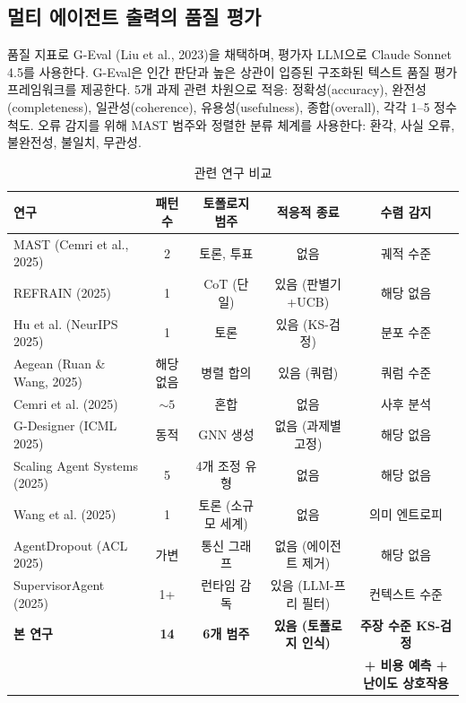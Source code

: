 \documentclass[a4paper,11pt]{article}
\begin{document}
\subsection{멀티 에이전트 출력의 품질 평가}

품질 지표로 G-Eval (Liu et al., 2023)을 채택하며, 평가자 LLM으로 Claude Sonnet 4.5를 사용한다. G-Eval은 인간 판단과 높은 상관이 입증된 구조화된 텍스트 품질 평가 프레임워크를 제공한다. 5개 과제 관련 차원으로 적응: 정확성(accuracy), 완전성(completeness), 일관성(coherence), 유용성(usefulness), 종합(overall), 각각 1--5 정수 척도. 오류 감지를 위해 MAST 범주와 정렬한 분류 체계를 사용한다: 환각, 사실 오류, 불완전성, 불일치, 무관성.

\begin{table}[H]
\centering
\caption{관련 연구 비교}
\label{tab:related-work}
{\small
\begin{tabular}{lcccc}
\toprule
\textbf{연구} & \textbf{패턴 수} & \textbf{토폴로지 범주} & \textbf{적응적 종료} & \textbf{수렴 감지} \\
\midrule
MAST (Cemri et al., 2025) & 2 & 토론, 투표 & 없음 & 궤적 수준 \\
REFRAIN (2025) & 1 & CoT (단일) & 있음 (판별기+UCB) & 해당 없음 \\
Hu et al. (NeurIPS 2025) & 1 & 토론 & 있음 (KS-검정) & 분포 수준 \\
Aegean (Ruan \& Wang, 2025) & 해당 없음 & 병렬 합의 & 있음 (쿼럼) & 쿼럼 수준 \\
Cemri et al. (2025) & ${\sim}5$ & 혼합 & 없음 & 사후 분석 \\
G-Designer (ICML 2025) & 동적 & GNN 생성 & 없음 (과제별 고정) & 해당 없음 \\
Scaling Agent Systems (2025) & 5 & 4개 조정 유형 & 없음 & 해당 없음 \\
Wang et al. (2025) & 1 & 토론 (소규모 세계) & 없음 & 의미 엔트로피 \\
AgentDropout (ACL 2025) & 가변 & 통신 그래프 & 없음 (에이전트 제거) & 해당 없음 \\
SupervisorAgent (2025) & 1+ & 런타임 감독 & 있음 (LLM-프리 필터) & 컨텍스트 수준 \\
\midrule
\textbf{본 연구} & \textbf{14} & \textbf{6개 범주} & \textbf{있음 (토폴로지 인식)} & \textbf{주장 수준 KS-검정} \\
 & & & & \textbf{+ 비용 예측 + 난이도 상호작용} \\
\bottomrule
\end{tabular}
}
\end{table}
\end{document}
